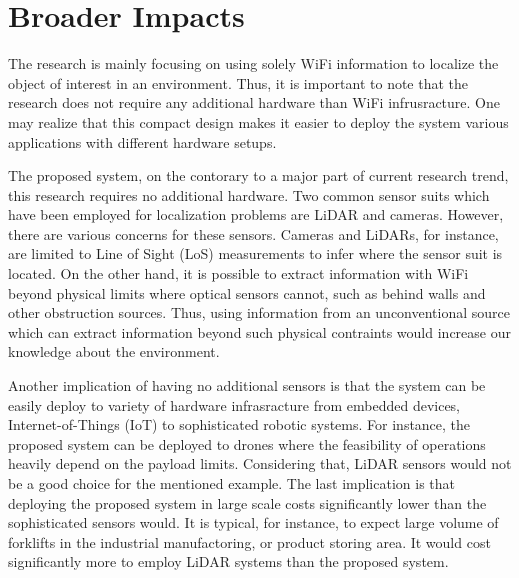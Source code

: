 \documentclass{article}
\begin{document}
\section{Broader Impacts}
    The research is mainly focusing on using solely WiFi information to localize the object of interest in an environment.
    Thus, it is important to note that the research does not require any additional hardware than WiFi infrusracture.
    One may realize that this compact design makes it easier to deploy the system various applications with different hardware setups.

    The proposed system, on the contorary to a major part of current research trend, this research requires no additional hardware.
    Two common sensor suits which have been employed for localization problems are LiDAR and cameras.
    However, there are various concerns for these sensors.
    Cameras and LiDARs, for instance, are limited to Line of Sight (LoS) measurements to infer where the sensor suit is located.
    On the other hand, it is possible to extract information with WiFi beyond physical limits where optical sensors cannot, such as behind walls and other obstruction sources.
    Thus, using information from an unconventional source which can extract information beyond such physical contraints would increase our knowledge about the environment.

    Another implication of having no additional sensors is that the system can be easily deploy to variety of hardware infrasracture from embedded devices, Internet-of-Things (IoT) to sophisticated robotic systems.
    For instance, the proposed system can be deployed to drones where the feasibility of operations heavily depend on the payload limits.
    Considering that, LiDAR sensors would not be a good choice for the mentioned example.
    The last implication is that deploying the proposed system in large scale costs significantly lower than the sophisticated sensors would.
    It is typical, for instance, to expect large volume of forklifts in the industrial manufactoring, or product storing area.
    It would cost significantly more to employ LiDAR systems than the proposed system.

\end{document}
